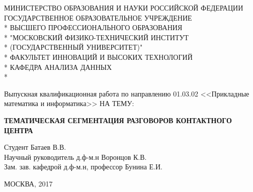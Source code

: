 \documentclass[pdftex,ptm,12pt,a4paper]{report}
\theoremstyle{definition}
\begin{document}
\begin{titlepage}
\newpage

\begin{center}
МИНИСТЕРСТВО ОБРАЗОВАНИЯ И НАУКИ РОССИЙСКОЙ ФЕДЕРАЦИИ \\
\vspace{0.5cm}
ГОСУДАРСТВЕННОЕ ОБРАЗОВАТЕЛЬНОЕ УЧРЕЖДЕНИЕ \\*
ВЫСШЕГО ПРОФЕССИОНАЛЬНОГО ОБРАЗОВАНИЯ\\*
"МОСКОВСКИЙ ФИЗИКО-ТЕХНИЧЕСКИЙ ИНСТИТУТ \\*
(ГОСУДАРСТВЕННЫЙ УНИВЕРСИТЕТ)" \\*
\vspace{0.5cm}
ФАКУЛЬТЕТ ИННОВАЦИЙ И ВЫСОКИХ ТЕХНОЛОГИЙ \\*
КАФЕДРА АНАЛИЗА ДАННЫХ \\*
\hrulefill
\end{center}


\vspace{8em}

\begin{center}
\Large Выпускная квалификационная работа по направлению 01.03.02 <<Прикладные математика и информатика>> \linebreak НА ТЕМУ:
\end{center}

\vspace{2.5em}

\begin{center}
\textsc{\large{\textbf{ТЕМАТИЧЕСКАЯ СЕГМЕНТАЦИЯ РАЗГОВОРОВ КОНТАКТНОГО ЦЕНТРА}}}
\end{center}

\vspace{6.5em}

\begin{flushleft}
Студент \hrulefill Батаев В.В. \\
\vspace{1.5em}
Научный руководитель д.ф-м.н \hrulefill Воронцов К.В.\\
\vspace{1.5em}
Зам. зав. кафедрой д.ф-м.н, профессор \hrulefill Бунина Е.И.
\end{flushleft}

\vspace{\fill}

\begin{center}
МОСКВА, 2017
\end{center}

\end{titlepage}
\end{document}
